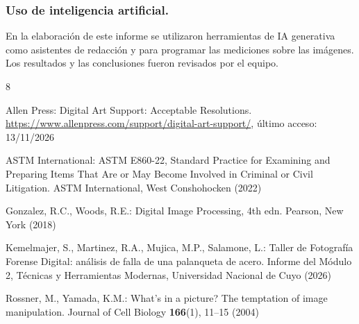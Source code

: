 \documentclass[runningheads]{llncs}
\begin{document}
\begin{credits}
\subsubsection{Uso de inteligencia artificial.} En la elaboración de este informe se utilizaron herramientas de IA generativa como asistentes de redacción y para programar las mediciones sobre las imágenes. Los resultados y las conclusiones fueron revisados por el equipo.
\end{credits}

\begin{thebibliography}{8}

Allen Press: Digital Art Support: Acceptable Resolutions. \url{https://www.allenpress.com/support/digital-art-support/}, último acceso: 13/11/2026

ASTM International: ASTM E860-22, Standard Practice for Examining and Preparing Items That Are or May Become Involved in Criminal or Civil Litigation. ASTM International, West Conshohocken (2022)

Gonzalez, R.C., Woods, R.E.: Digital Image Processing, 4th edn. Pearson, New York (2018)

Kemelmajer, S., Martinez, R.A., Mujica, M.P., Salamone, L.: Taller de Fotografía Forense Digital: análisis de falla de una palanqueta de acero. Informe del Módulo 2, Técnicas y Herramientas Modernas, Universidad Nacional de Cuyo (2026)

Rossner, M., Yamada, K.M.: What's in a picture? The temptation of image manipulation. Journal of Cell Biology \textbf{166}(1), 11--15 (2004)

\end{thebibliography}
\end{document}
